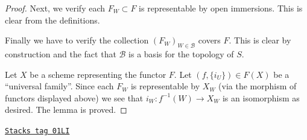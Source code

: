 \begin{proof}
\medskip\noindent
Next, we verify each $F_W \subset F$ is representable by open immersions.
This is clear from the definitions.

\medskip\noindent
Finally we have to verify
the collection $(F_W)_{W \in \mathcal{B}}$ covers $F$.
This is clear by construction and the fact that $\mathcal{B}$ is
a basis for the topology of $S$.

\medskip\noindent
Let $X$ be a scheme representing the functor $F$.
Let $(f, \{i_U\}) \in F(X)$ be a ``universal family''.
Since each $F_W$ is representable by $X_W$ (via the morphism of functors
displayed above) we see that $i_W : f^{-1}(W) \to X_W$
is an isomorphism as desired. The lemma is proved.
\end{proof}

\begin{lemma}
\label{constructions-lemma-relative-glueing-sheaves}
\href{https://stacks.math.columbia.edu/tag/01LI}{\texttt{Stacks tag 01LI}}


\end{lemma}
